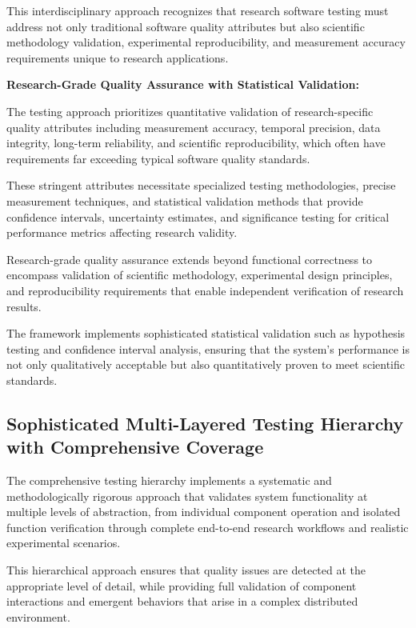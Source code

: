 This interdisciplinary approach recognizes that research software testing must address not only traditional software quality attributes but also scientific methodology validation, experimental reproducibility, and measurement accuracy requirements unique to research applications.

\textbf{Research-Grade Quality Assurance with Statistical Validation:}

The testing approach prioritizes quantitative validation of research-specific quality attributes including measurement accuracy, temporal precision, data integrity, long-term reliability, and scientific reproducibility, which often have requirements far exceeding typical software quality standards.

These stringent attributes necessitate specialized testing methodologies, precise measurement techniques, and statistical validation methods that provide confidence intervals, uncertainty estimates, and significance testing for critical performance metrics affecting research validity.

Research-grade quality assurance extends beyond functional correctness to encompass validation of scientific methodology, experimental design principles, and reproducibility requirements that enable independent verification of research results.

The framework implements sophisticated statistical validation such as hypothesis testing and confidence interval analysis, ensuring that the system's performance is not only qualitatively acceptable but also quantitatively proven to meet scientific standards.

\subsection{Sophisticated Multi-Layered Testing Hierarchy with Comprehensive Coverage}

The comprehensive testing hierarchy implements a systematic and methodologically rigorous approach that validates system functionality at multiple levels of abstraction, from individual component operation and isolated function verification through complete end-to-end research workflows and realistic experimental scenarios.

This hierarchical approach ensures that quality issues are detected at the appropriate level of detail, while providing full validation of component interactions and emergent behaviors that arise in a complex distributed environment.


